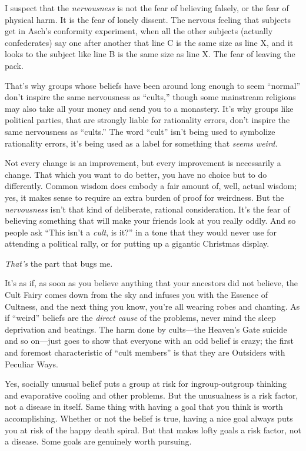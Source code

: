 {
 I suspect that the \textit{nervousness} is not the fear of
believing falsely, or the fear of physical harm. It is the fear of
lonely dissent. The nervous feeling that subjects get in
Asch's conformity experiment, when all the other
subjects (actually confederates) say one after another that line C is
the same size as line X, and it looks to the subject like line B is the
same size as line X. The fear of leaving the pack.}

{
 That's why groups whose beliefs have been around
long enough to seem ``normal''
don't inspire the same nervousness as
``cults,'' though some mainstream
religions may also take all your money and send you to a monastery.
It's why groups like political parties, that are
strongly liable for rationality errors, don't inspire
the same nervousness as ``cults.''
The word ``cult''
isn't being used to symbolize rationality errors,
it's being used as a label for something that
\textit{seems weird.}}

{
 Not every change is an improvement, but every improvement is
necessarily a change. That which you want to do better, you have no
choice but to do differently. Common wisdom does embody a fair amount
of, well, actual wisdom; yes, it makes sense to require an extra burden
of proof for weirdness. But the \textit{nervousness}
isn't that kind of deliberate, rational consideration.
It's the fear of believing something that will make
your friends look at you really oddly. And so people ask
``This isn't a \textit{cult}, is
it?'' in a tone that they would never use for
attending a political rally, or for putting up a gigantic Christmas
display.}

{
 \textit{That's} the part that bugs me.}

{
 It's as if, as soon as you believe anything that
your ancestors did not believe, the Cult Fairy comes down from the sky
and infuses you with the Essence of Cultness, and the next thing you
know, you're all wearing robes and chanting. As if
``weird'' beliefs are the
\textit{direct cause} of the problems, never mind the sleep deprivation
and beatings. The harm done by cults---the Heaven's
Gate suicide and so on---just goes to show that everyone with an odd
belief is crazy; the first and foremost characteristic of
``cult members'' is that they are
Outsiders with Peculiar Ways.}

{
 Yes, socially unusual belief puts a group at risk for
ingroup-outgroup thinking and evaporative cooling and other problems.
But the unusualness is a risk factor, not a disease in itself. Same
thing with having a goal that you think is worth accomplishing. Whether
or not the belief is true, having a nice goal always puts you at risk
of the happy death spiral. But that makes lofty goals a risk factor,
not a disease. Some goals are genuinely worth pursuing.}

